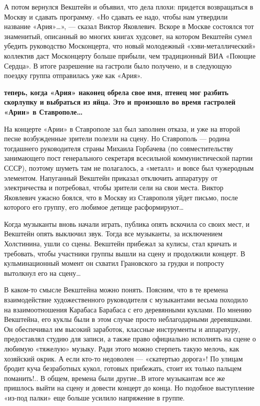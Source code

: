 \documentclass[16pt,a5paper,oneside]{book}
\begin{document}
А потом вернулся Векштейн и объявил, что дела плохи: придется возвращаться в Москву и сдавать программу. «Но сдавать ее
надо, чтобы нам утвердили название «Ария»\ldots», — сказал Виктор Яковлевич. Вскоре в Москве состоялся тот знаменитый,
описанный во многих книгах худсовет, на котором Векштейн сумел убедить руководство Москонцерта, что новый молодежный
«хэви-металлический» коллектив даст Москонцерту больше прибыли, чем традиционный ВИА «Поющие Сердца». В итоге разрешение
на гастроли было получено, и в следующую поездку группа отправилась уже как «Ария».

\textbf{ теперь, когда «Ария» наконец обрела свое имя, птенец мог разбить скорлупку и выбраться из яйца. Это
и произошло во время гастролей «Арии» в Ставрополе\ldots}

На концерте «Арии» в Ставрополе зал был заполнен отказа, и уже на второй песне возбужденные зрители полезли на сцену. Но
Ставрополь — родина тогдашнего руководителя страны Михаила Горбачева (по совместительству занимающего пост генерального
секретаря всесильной коммунистической партии СССР), поэтому шуметь там не полагалось, а «металл» и вовсе был чужеродным
элементом. Напуганный Векштейн приказал отключить аппаратуру от электричества и потребовал, чтобы зрители сели на свои
места. Виктор Яковлевич ужасно боялся, что в Москву из Ставрополя уйдет письмо, после которого его группу, его любимое
детище расформируют\ldots

Когда музыканты вновь начали играть, публика опять вскочила со своих мест, и Векштейн опять выключил звук. Тогда все
музыканты, за исключением Холстинина, ушли со сцены. Векштейн прибежал за кулисы, стал кричать и требовать, чтобы
участники группы вышли на сцену и продолжили концерт. В кульминационный момент он схватил Грановского за грудки и
попросту вытолкнул его на сцену\ldots

В каком-то смысле Векштейна можно понять. Поясним, что в те времена взаимодействие художественного руководителя с
музыкантами весьма походило на взаимоотношения Карабаса Барабаса с его деревянными куклами. По мнению Векштейна, его
куклы были в этом случае просто неблагодарными деревяшками. Он обеспечивал им высокий заработок, классные инструменты и
аппаратуру, предоставлял студию для записи, а также право официально исполнять на сцене о любимую «тяжелую» музыку. Ради
этого можно стерпеть такую мелочь, как хозяйский окрик. А если кто-то недоволен — «скатертью дорога»! По улицам бродит
куча безработных кукол, готовых прибежать, стоит их только пальцем поманить!.. В общем, времена были другие\ldots В
итоге музыкантам все же пришлось выйти на сцену и довести концерт до конца. Но подобное выступление «из-под палки» еще
больше усилило напряжение в группе.
\end{document}
